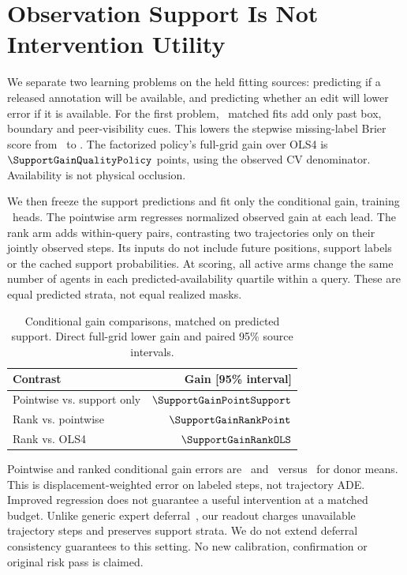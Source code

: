 \section{Observation Support Is Not Intervention Utility}
We separate two learning problems on the held fitting sources:
predicting if a released annotation will be available, and
predicting whether an edit will lower error if it is available.
For the first problem, \SupportGainObsFits\ matched fits add only
past box, boundary and peer-visibility cues. This lowers the
stepwise missing-label Brier score from \SupportGainMotionBrier\
to \SupportGainQualityBrier. The factorized policy's full-grid
gain over OLS4 is $\SupportGainQualityPolicy$ points, using the
observed CV denominator. Availability is not physical occlusion.

We then freeze the support predictions and fit only the conditional
gain, training \SupportGainCondFits\ heads. The pointwise arm
regresses normalized observed gain at each lead. The rank arm
adds within-query pairs, contrasting two trajectories only on
their jointly observed steps. Its inputs do not include future
positions, support labels or the cached support probabilities.
At scoring, all active arms change the same number of agents in
each predicted-availability quartile within a query. These are
equal predicted strata, not equal realized masks.

\begin{table}[h]
\centering\small
\caption{Conditional gain comparisons, matched on predicted support.
Direct full-grid lower gain and paired 95\% source intervals.}
\label{tab:support-gain}
\begin{tabular}{@{}lr@{}}
\toprule
Contrast & Gain [95\% interval] \\
\midrule
Pointwise vs. support only & $\SupportGainPointSupport$ \\
Rank vs. pointwise & $\SupportGainRankPoint$ \\
Rank vs. OLS4 & $\SupportGainRankOLS$ \\
\bottomrule
\end{tabular}
\end{table}

Pointwise and ranked conditional gain errors are
\SupportGainPointError\ and \SupportGainRankError\ versus
\SupportGainMeanError\ for donor means. This is displacement-weighted
error on labeled steps, not trajectory ADE. Improved regression
does not guarantee a useful intervention at a matched budget.
Unlike generic expert deferral~\cite{mao}, our readout charges
unavailable trajectory steps and preserves support strata.
We do not extend deferral consistency guarantees to this setting.
No new calibration, confirmation or original risk pass is claimed.
